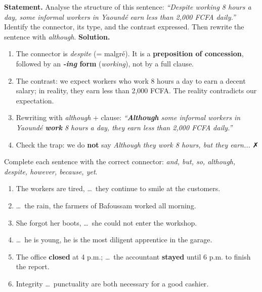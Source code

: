 \documentclass[11pt]{article}
\begin{document}
\begin{exoresolu}
\textbf{Statement.} Analyse the structure of this sentence: \emph{``Despite working 8 hours a day, some informal workers in Yaoundé earn less than 2,000 FCFA daily.''} Identify the connector, its type, and the contrast expressed. Then rewrite the sentence with \emph{although}.
\tcblower
\textbf{Solution.}
\begin{enumerate}
\item The connector is \emph{despite} (= malgré). It is a \textbf{preposition of concession}, followed by an \textbf{\emph{-ing} form} (\emph{working}), not by a full clause.
\item The contrast: we expect workers who work 8 hours a day to earn a decent salary; in reality, they earn less than 2,000 FCFA. The reality contradicts our expectation.
\item Rewriting with \emph{although} + clause: \emph{``\textbf{Although} some informal workers in Yaoundé \textbf{work} 8 hours a day, they earn less than 2,000 FCFA daily.''}
\item Check the trap: we do \textbf{not} say \emph{Although they work 8 hours, but they earn...} ✗
\end{enumerate}
\end{exoresolu}

\begin{exercice}
Complete each sentence with the correct connector: \emph{and, but, so, although, despite, however, because, yet}.
\begin{enumerate}
\item The workers are tired, \dots\ they continue to smile at the customers.
\item \dots\ the rain, the farmers of Bafoussam worked all morning.
\item She forgot her boots, \dots\ she could not enter the workshop.
\item \dots\ he is young, he is the most diligent apprentice in the garage.
\item The office \textbf{closed} at 4 p.m.; \dots\ the accountant \textbf{stayed} until 6 p.m. to finish the report.
\item Integrity \dots\ punctuality are both necessary for a good cashier.
\end{enumerate}
\end{exercice}
\end{document}
